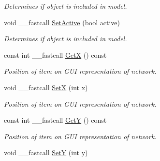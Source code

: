 \begin{DoxyCompactItemize}
\begin{DoxyCompactList}\small\item\em Determines if object is included in model. \end{DoxyCompactList}\item 
\hypertarget{class_t_r_t_base_a80f01fe30e7b4c979dd420bb3f41aef0}{void \+\_\+\+\_\+fastcall \hyperlink{class_t_r_t_base_a80f01fe30e7b4c979dd420bb3f41aef0}{Set\+Active} (bool active)}\label{class_t_r_t_base_a80f01fe30e7b4c979dd420bb3f41aef0}

\begin{DoxyCompactList}\small\item\em Determines if object is included in model. \end{DoxyCompactList}\item 
\hypertarget{class_t_r_t_base_a06f28e5bca2187b9ebcea8c2bc367f98}{const int \+\_\+\+\_\+fastcall \hyperlink{class_t_r_t_base_a06f28e5bca2187b9ebcea8c2bc367f98}{Get\+X} () const }\label{class_t_r_t_base_a06f28e5bca2187b9ebcea8c2bc367f98}

\begin{DoxyCompactList}\small\item\em Position of item on G\+U\+I representation of network. \end{DoxyCompactList}\item 
\hypertarget{class_t_r_t_base_ac727c29c5b1fbad3bd45efdb03f1b5f0}{void \+\_\+\+\_\+fastcall \hyperlink{class_t_r_t_base_ac727c29c5b1fbad3bd45efdb03f1b5f0}{Set\+X} (int x)}\label{class_t_r_t_base_ac727c29c5b1fbad3bd45efdb03f1b5f0}

\begin{DoxyCompactList}\small\item\em Position of item on G\+U\+I representation of network. \end{DoxyCompactList}\item 
\hypertarget{class_t_r_t_base_aa06da8b3fa1116a2e12f64fb3f408dde}{const int \+\_\+\+\_\+fastcall \hyperlink{class_t_r_t_base_aa06da8b3fa1116a2e12f64fb3f408dde}{Get\+Y} () const }\label{class_t_r_t_base_aa06da8b3fa1116a2e12f64fb3f408dde}

\begin{DoxyCompactList}\small\item\em Position of item on G\+U\+I representation of network. \end{DoxyCompactList}\item 
\hypertarget{class_t_r_t_base_af874732b636ea9a9ce26fb393e283b51}{void \+\_\+\+\_\+fastcall \hyperlink{class_t_r_t_base_af874732b636ea9a9ce26fb393e283b51}{Set\+Y} (int y)}\label{class_t_r_t_base_af874732b636ea9a9ce26fb393e283b51}


\end{DoxyCompactItemize}
